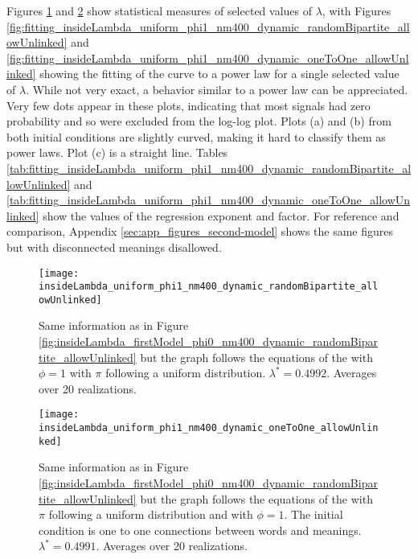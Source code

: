 Figures \ref{fig:insideLambda_uniform_phi1_nm400_dynamic_randomBipartite_allowUnlinked} and \ref{fig:insideLambda_uniform_phi1_nm400_dynamic_oneToOne_allowUnlinked} show statistical measures of selected values of $\lambda$, with Figures \ref{fig:fitting_insideLambda_uniform_phi1_nm400_dynamic_randomBipartite_allowUnlinked} and \ref{fig:fitting_insideLambda_uniform_phi1_nm400_dynamic_oneToOne_allowUnlinked} showing the fitting of the curve to a power law for a single selected value of $\lambda$.
While not very exact, a behavior similar to a power law can be appreciated.
Very few dots appear in these plots, indicating that most signals had zero probability and so were excluded from the log-log plot.
Plots (a) and (b) from both initial conditions are slightly curved, making it hard to classify them as power laws.
Plot (c) is a straight line.
Tables \ref{tab:fitting_insideLambda_uniform_phi1_nm400_dynamic_randomBipartite_allowUnlinked} and \ref{tab:fitting_insideLambda_uniform_phi1_nm400_dynamic_oneToOne_allowUnlinked} show the values of the regression exponent and factor.
For reference and comparison, Appendix \ref{sec:app_figures_second-model} shows the same figures but with disconnected meanings disallowed.

\begin{figure}
  \centering
  \texttt{[image: insideLambda\_uniform\_phi1\_nm400\_dynamic\_randomBipartite\_allowUnlinked]}
  \caption{Same information as in Figure \ref{fig:insideLambda_firstModel_phi0_nm400_dynamic_randomBipartite_allowUnlinked} but the graph follows the equations of the \secondmodel{} with $\phi=1$ with $\pi$ following a uniform distribution. $\lambda^* = 0.4992$.
  Averages over 20 realizations.}
  \label{fig:insideLambda_uniform_phi1_nm400_dynamic_randomBipartite_allowUnlinked}
\end{figure}

\begin{figure}
  \centering
  \texttt{[image: insideLambda\_uniform\_phi1\_nm400\_dynamic\_oneToOne\_allowUnlinked]}
  \caption{Same information as in Figure \ref{fig:insideLambda_firstModel_phi0_nm400_dynamic_randomBipartite_allowUnlinked} but the graph follows the equations of the \secondmodel{} with $\pi$ following a uniform distribution and with $\phi=1$. The initial condition is one to one connections between words and meanings. $\lambda^* = 0.4991$.
Averages over 20 realizations.}
  \label{fig:insideLambda_uniform_phi1_nm400_dynamic_oneToOne_allowUnlinked}
\end{figure}

